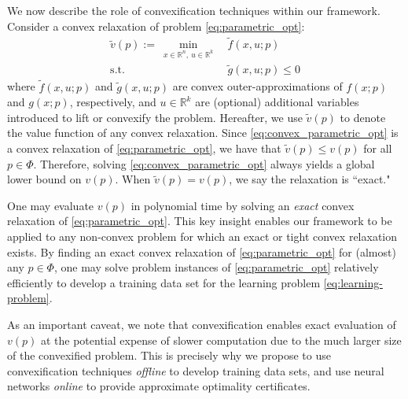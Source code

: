 \documentclass[10pt]{article} %
\theoremstyle{plain}
\theoremstyle{definition}
\theoremstyle{remark}
\begin{document}
We now describe the role of convexification techniques within our framework. Consider a convex relaxation of problem \eqref{eq:parametric_opt}:
\begin{equation}
\begin{aligned}
    \tilde{v}(p) := ~\min_{x \in \mathbb{R}^n,~ u \in \mathbb{R}^k}~&\tilde{f}(x, u;p)  \\
    \text{s.t.}~~~~~& \tilde{g}(x, u; p) \leq 0
\end{aligned} \label{eq:convex_parametric_opt}
\end{equation}
where $\tilde{f}(x,u;p)$ and $\tilde{g}(x, u; p)$ are convex outer-approximations of $f(x;p)$ and $g(x; p)$, respectively, and $u \in \mathbb{R}^k$ are (optional) additional variables introduced to lift or convexify the problem.
Hereafter, we use $\tilde{v}(p)$ to denote the value function of any convex relaxation. Since \eqref{eq:convex_parametric_opt} is a convex relaxation of \eqref{eq:parametric_opt}, we have that $\tilde{v}(p) \leq v(p)$ for all $p \in \Phi$. Therefore, solving \eqref{eq:convex_parametric_opt} always yields a global lower bound on $v(p)$. When $\tilde{v}(p) = v(p)$, we say the relaxation is ``exact."

One may evaluate $v(p)$ in polynomial time by solving an \textit{exact} convex relaxation of \eqref{eq:parametric_opt}. This key insight enables our framework to be applied to any non-convex problem for which an exact or tight convex relaxation exists. By finding an exact convex relaxation of \eqref{eq:parametric_opt} for (almost) any $p \in \Phi$, one may solve problem instances of \eqref{eq:parametric_opt} relatively efficiently to develop a training data set for the learning problem \eqref{eq:learning-problem}.


As an important caveat, we note that convexification enables exact evaluation of $v(p)$ at the potential expense of slower computation due to the much larger size of the convexified problem.
This is precisely why we propose to use convexification techniques \textit{offline} to develop training data sets, and use neural networks \textit{online} to provide approximate optimality certificates.
\end{document}
